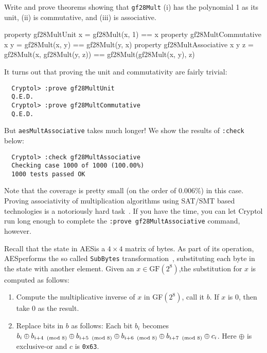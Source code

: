 \begin{Exercise}\label{ex:gf:2}
  Write and prove theorems showing that {\tt gf28Mult} (i) has the
  polynomial 1 as its unit, (ii) is commutative, and (iii) is
  associative.
\end{Exercise}
\begin{Answer}
\begin{code}
  property gf28MultUnit         x =      gf28Mult(x, 1) == x
  property gf28MultCommutative  x y =    gf28Mult(x, y) == gf28Mult(y, x)
  property gf28MultAssociative  x y z =  gf28Mult(x, gf28Mult(y, z))
                                         == gf28Mult(gf28Mult(x, y), z)
\end{code}
It turns out that proving the unit and commutativity are fairly
trivial:\indCmdProve
\begin{Verbatim}
  Cryptol> :prove gf28MultUnit 
  Q.E.D.
  Cryptol> :prove gf28MultCommutative
  Q.E.D.
\end{Verbatim}
But {\tt aesMultAssociative} takes much longer! We show the results of
{\tt :check} below:\indCmdCheck
\begin{Verbatim}
  Cryptol> :check gf28MultAssociative
  Checking case 1000 of 1000 (100.00%) 
  1000 tests passed OK
\end{Verbatim}
Note that the coverage is pretty small (on the order of $0.006\%$)
in this case. Proving associativity of multiplication algorithms using
SAT/SMT based technologies is a notoriously hard task~\cite[section
6.3.1]{DecisionProcedures2008}. If you have the time, you can let
Cryptol run long enough to complete the {\tt :prove
  gf28MultAssociative} command, however.
\end{Answer}



Recall that the state in AES\indAES is a $4\times4$ matrix of
bytes. As part of its operation, AES\indAES performs the so called
{\tt SubBytes} transformation\indAESSbox~\cite[section 5.1.1]{aes},
substituting each byte in the state with another element. Given an $x
\in \mbox{GF}(2^8)$,\indGF the substitution for $x$ is computed as
follows:
\begin{enumerate}
\item Compute the multiplicative inverse of $x$ in GF$(2^8)$\indGF,
  call it $b$. If $x$ is 0, then take 0 as the result.
 \item Replace bits in $b$ as follows: Each bit $b_i$ becomes $b_i
   \oplus b_{i+4\imod{8}} \oplus b_{i+5\imod{8}} \oplus
   b_{i+6\imod{8}} \oplus b_{i+7\imod{8}} \oplus c_i$.  Here $\oplus$
   is exclusive-or and $c$ is {\tt 0x63}.
\end{enumerate}

